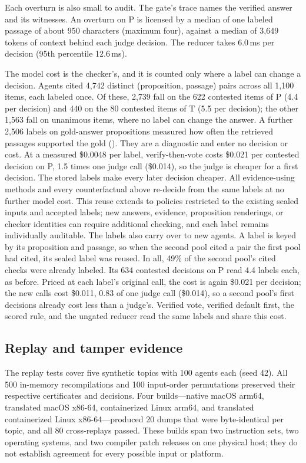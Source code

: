 Each overturn is also small to audit. The gate's trace names the verified answer and its witnesses. An overturn on P is licensed by a median of one labeled passage of about 950 characters (maximum four), against a median of 3,649 tokens of context behind each judge decision. The reducer takes 6.0\,ms per decision (95th percentile 12.6\,ms).

The model cost is the checker's, and it is counted only where a label can change a decision. Agents cited 4,742 distinct (proposition, passage) pairs across all 1,100 items, each labeled once. Of these, 2,739 fall on the 622 contested items of P (4.4 per decision) and 440 on the 80 contested items of T (5.5 per decision); the other 1,563 fall on unanimous items, where no label can change the answer. A further 2,506 labels on gold-answer propositions measured how often the retrieved passages supported the gold (). They are a diagnostic and enter no decision or cost. At a measured \$0.0048 per label, verify-then-vote costs \$0.021 per contested decision on P, 1.5 times one judge call (\$0.014), so the judge is cheaper for a first decision. The stored labels make every later decision cheaper. All evidence-using methods and every counterfactual above re-decide from the same labels at no further model cost. This reuse extends to policies restricted to the existing sealed inputs and accepted labels; new answers, evidence, proposition renderings, or checker identities can require additional checking, and each label remains individually auditable. The labels also carry over to new agents. A label is keyed by its proposition and passage, so when the second pool cited a pair the first pool had cited, its sealed label was reused. In all, 49\% of the second pool's cited checks were already labeled. Its 634 contested decisions on P read 4.4 labels each, as before. Priced at each label's original call, the cost is again \$0.021 per decision; the new calls cost \$0.011, 0.83 of one judge call (\$0.014), so a second pool's first decisions already cost less than a judge's. Verified vote, verified default first, the scored rule, and the ungated reducer read the same labels and share this cost.

\subsection{Replay and tamper evidence}
\label{sec:replay}

The replay tests cover five synthetic topics with 100 agents each (seed 42). All 500 in-memory recompilations and 100 input-order permutations preserved their respective certificates and decisions. Four builds---native macOS arm64, translated macOS x86-64, containerized Linux arm64, and translated containerized Linux x86-64---produced 20 dumps that were byte-identical per topic, and all 80 cross-replays passed. These builds span two instruction sets, two operating systems, and two compiler patch releases on one physical host; they do not establish agreement for every possible input or platform.


